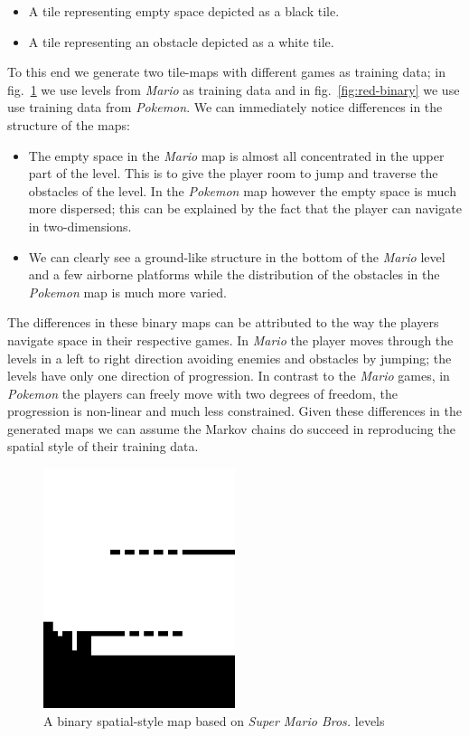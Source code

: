 \documentclass[A4paper,]{article}
\providecommand{\tightlist}{%
  \setlength{\itemsep}{0pt}\setlength{\parskip}{0pt}}
\begin{document}
\begin{itemize}
\tightlist
\item
  A tile representing empty space depicted as a black tile.
\item
  A tile representing an obstacle depicted as a white tile.
\end{itemize}

To this end we generate two tile-maps with different games as training
data; in fig.~\ref{fig:mario-binary} we use levels from \emph{Mario} as
training data and in fig.~\ref{fig:red-binary} we use use training data
from \emph{Pokemon}. We can immediately notice differences in the
structure of the maps:

\begin{itemize}
\tightlist
\item
  The empty space in the \emph{Mario} map is almost all concentrated in
  the upper part of the level. This is to give the player room to jump
  and traverse the obstacles of the level. In the \emph{Pokemon} map
  however the empty space is much more dispersed; this can be explained
  by the fact that the player can navigate in two-dimensions.
\item
  We can clearly see a ground-like structure in the bottom of the
  \emph{Mario} level and a few airborne platforms while the distribution
  of the obstacles in the \emph{Pokemon} map is much more varied.
\end{itemize}

The differences in these binary maps can be attributed to the way the
players navigate space in their respective games. In \emph{Mario} the
player moves through the levels in a left to right direction avoiding
enemies and obstacles by jumping; the levels have only one direction of
progression. In contrast to the \emph{Mario} games, in \emph{Pokemon}
the players can freely move with two degrees of freedom, the progression
is non-linear and much less constrained. Given these differences in the
generated maps we can assume the Markov chains do succeed in reproducing
the spatial style of their training data.

\begin{figure}
\centering
\includegraphics[width=0.50000\textwidth]{../data/super-mario-bros/generated/250n-3k-binary/image/105.png}
\caption{A binary spatial-style map based on \emph{Super Mario Bros.}
levels}\label{fig:mario-binary}
\end{figure}
\end{document}
